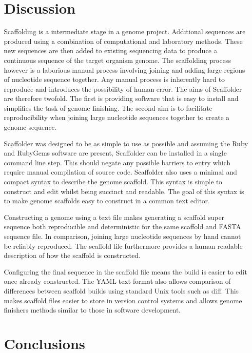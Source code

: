 \documentclass[10pt]{bmc_article}
\newenvironment{bmcformat}{\begin{raggedright}\baselineskip20pt\sloppy\setboolean{publ}{false}}{\end{raggedright}\baselineskip20pt\sloppy}
\begin{document}
\begin{bmcformat}
\section*{Discussion} %

Scaffolding is a intermediate stage in a genome project. Additional sequences
are produced using a combination of computational and laboratory methods. These
new sequences are then added to existing sequencing data to produce
a continuous sequence of the target organism genome. The scaffolding process
however is a laborious manual process involving joining and adding large
regions of nucleotide sequence together. Any manual process is inherently hard
to reproduce and introduces the possibility of human error. The aims of
Scaffolder are therefore twofold. The first is providing software that is easy
to install and simplifies the task of genome finishing. The second aim is to
facilitate reproducibility when joining large nucleotide sequences together to
create a genome sequence. \pb

Scaffolder was designed to be as simple to use as possible and assuming the
Ruby and RubyGems software are present, Scaffolder can be installed in a single
command line step. This should negate any possible barriers to entry which
require manual compilation of source code. Scaffolder also uses a minimal and
compact syntax to describe the genome scaffold. This syntax is simple to
construct and edit whilst being succinct and readable. The goal of this syntax
is to make genome scaffolds easy to construct in a common text editor. \pb

Constructing a genome using a text file makes generating a scaffold super
sequence both reproducible and deterministic for the same scaffold and FASTA
sequence file. In comparison, joining large nucleotide sequences by hand cannot
be reliably reproduced. The scaffold file furthermore provides a human readable
description of how the scaffold is constructed. \pb

Configuring the final sequence in the scaffold file means the build is easier
to edit once already constructed. The YAML text format also allows comparison
of differences between scaffold builds using standard Unix tools such as diff.
This makes scaffold files easier to store in version control systems and allows
genome finishers methods similar to those in software development. \pb 

\clearpage

\section*{Conclusions} %


\end{bmcformat}
\end{document}
